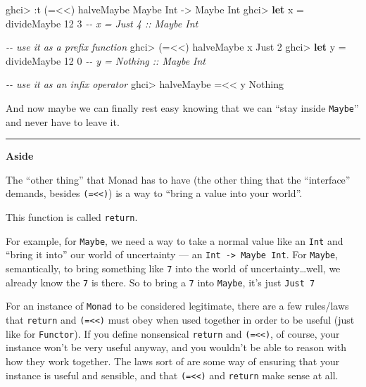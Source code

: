 \documentclass[]{article}
\newenvironment{Shaded}{}{}
\newcommand{\CommentTok}[1]{\textcolor[rgb]{0.38,0.63,0.69}{\textit{#1}}}
\newcommand{\DataTypeTok}[1]{\textcolor[rgb]{0.56,0.13,0.00}{#1}}
\newcommand{\DecValTok}[1]{\textcolor[rgb]{0.25,0.63,0.44}{#1}}
\newcommand{\KeywordTok}[1]{\textcolor[rgb]{0.00,0.44,0.13}{\textbf{#1}}}
\newcommand{\NormalTok}[1]{#1}
\newcommand{\OperatorTok}[1]{\textcolor[rgb]{0.40,0.40,0.40}{#1}}
\newcommand{\OtherTok}[1]{\textcolor[rgb]{0.00,0.44,0.13}{#1}}
\begin{document}
\begin{Shaded}
\begin{Highlighting}[]
\NormalTok{ghci}\OperatorTok{\textgreater{}} \OperatorTok{:}\NormalTok{t (}\OperatorTok{=\textless{}\textless{}}\NormalTok{) halveMaybe}
\DataTypeTok{Maybe} \DataTypeTok{Int} \OtherTok{{-}\textgreater{}} \DataTypeTok{Maybe} \DataTypeTok{Int}
\NormalTok{ghci}\OperatorTok{\textgreater{}} \KeywordTok{let}\NormalTok{ x }\OtherTok{=}\NormalTok{ divideMaybe }\DecValTok{12} \DecValTok{3}     \CommentTok{{-}{-} x = Just 4 :: Maybe Int}

\CommentTok{{-}{-} use it as a prefix function}
\NormalTok{ghci}\OperatorTok{\textgreater{}}\NormalTok{ (}\OperatorTok{=\textless{}\textless{}}\NormalTok{) halveMaybe x}
\DataTypeTok{Just} \DecValTok{2}
\NormalTok{ghci}\OperatorTok{\textgreater{}} \KeywordTok{let}\NormalTok{ y }\OtherTok{=}\NormalTok{ divideMaybe }\DecValTok{12} \DecValTok{0}     \CommentTok{{-}{-} y = Nothing :: Maybe Int}

\CommentTok{{-}{-} use it as an infix operator}
\NormalTok{ghci}\OperatorTok{\textgreater{}}\NormalTok{ halveMaybe }\OperatorTok{=\textless{}\textless{}}\NormalTok{ y}
\DataTypeTok{Nothing}
\end{Highlighting}
\end{Shaded}

And now maybe we can finally rest easy knowing that we can ``stay inside
\texttt{Maybe}'' and never have to leave it.

\begin{center}\rule{0.5\linewidth}{0.5pt}\end{center}

\textbf{Aside}

The ``other thing'' that Monad has to have (the other thing that the
``interface'' demands, besides \texttt{(=\textless{}\textless{})}) is a way to
``bring a value into your world''.

This function is called \texttt{return}.

For example, for \texttt{Maybe}, we need a way to take a normal value like an
\texttt{Int} and ``bring it into'' our world of uncertainty --- an
\texttt{Int\ -\textgreater{}\ Maybe\ Int}. For \texttt{Maybe}, semantically, to
bring something like \texttt{7} into the world of uncertainty\ldots well, we
already know the \texttt{7} is there. So to bring a \texttt{7} into
\texttt{Maybe}, it's just \texttt{Just\ 7}

For an instance of \texttt{Monad} to be considered legitimate, there are a few
rules/laws that \texttt{return} and \texttt{(=\textless{}\textless{})} must obey
when used together in order to be useful (just like for \texttt{Functor}). If
you define nonsensical \texttt{return} and \texttt{(=\textless{}\textless{})},
of course, your instance won't be very useful anyway, and you wouldn't be able
to reason with how they work together. The laws sort of are some way of ensuring
that your instance is useful and sensible, and that
\texttt{(=\textless{}\textless{})} and \texttt{return} make sense at all.
\end{document}
